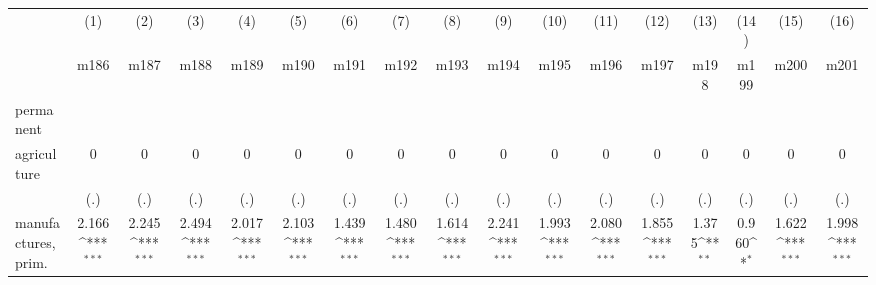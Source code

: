 {
\def\sym#1{\ifmmode^{#1}\else\(^{#1}\)\fi}
\begin{tabular}{l*{16}{c}}
\hline\hline
                    &\multicolumn{1}{c}{(1)}&\multicolumn{1}{c}{(2)}&\multicolumn{1}{c}{(3)}&\multicolumn{1}{c}{(4)}&\multicolumn{1}{c}{(5)}&\multicolumn{1}{c}{(6)}&\multicolumn{1}{c}{(7)}&\multicolumn{1}{c}{(8)}&\multicolumn{1}{c}{(9)}&\multicolumn{1}{c}{(10)}&\multicolumn{1}{c}{(11)}&\multicolumn{1}{c}{(12)}&\multicolumn{1}{c}{(13)}&\multicolumn{1}{c}{(14)}&\multicolumn{1}{c}{(15)}&\multicolumn{1}{c}{(16)}\\
                    &\multicolumn{1}{c}{m186}&\multicolumn{1}{c}{m187}&\multicolumn{1}{c}{m188}&\multicolumn{1}{c}{m189}&\multicolumn{1}{c}{m190}&\multicolumn{1}{c}{m191}&\multicolumn{1}{c}{m192}&\multicolumn{1}{c}{m193}&\multicolumn{1}{c}{m194}&\multicolumn{1}{c}{m195}&\multicolumn{1}{c}{m196}&\multicolumn{1}{c}{m197}&\multicolumn{1}{c}{m198}&\multicolumn{1}{c}{m199}&\multicolumn{1}{c}{m200}&\multicolumn{1}{c}{m201}\\
\hline
permanent           &                     &                     &                     &                     &                     &                     &                     &                     &                     &                     &                     &                     &                     &                     &                     &                     \\
agriculture         &           0         &           0         &           0         &           0         &           0         &           0         &           0         &           0         &           0         &           0         &           0         &           0         &           0         &           0         &           0         &           0         \\
                    &         (.)         &         (.)         &         (.)         &         (.)         &         (.)         &         (.)         &         (.)         &         (.)         &         (.)         &         (.)         &         (.)         &         (.)         &         (.)         &         (.)         &         (.)         &         (.)         \\
[1em]
manufactures, prim. &       2.166\sym{***}&       2.245\sym{***}&       2.494\sym{***}&       2.017\sym{***}&       2.103\sym{***}&       1.439\sym{***}&       1.480\sym{***}&       1.614\sym{***}&       2.241\sym{***}&       1.993\sym{***}&       2.080\sym{***}&       1.855\sym{***}&       1.375\sym{**} &       0.960\sym{*}  &       1.622\sym{***}&       1.998\sym{***}\\

\end{tabular}}
